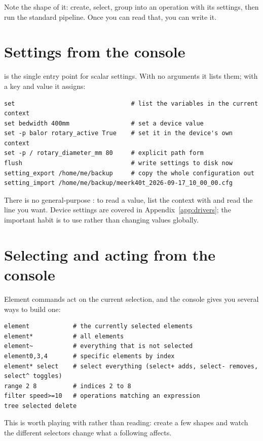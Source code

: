 \noindent Note the shape of it: create, select, group into an operation with its
settings, then run the standard pipeline. Once you can read that, you can write
it.

\section{Settings from the console}

 is the single entry point for scalar settings. With no arguments it
lists them; with a key and value it assigns:

\begin{lstlisting}[style=konsole]
set                                # list the variables in the current context
set bedwidth 400mm                 # set a device value
set -p balor rotary_active True    # set it in the device's own context
set -p / rotary_diameter_mm 80     # explicit path form
flush                              # write settings to disk now
setting_export /home/me/backup     # copy the whole configuration out
setting_import /home/me/backup/meerk40t_2026-09-17_10_00_00.cfg
\end{lstlisting}

\noindent There is no general-purpose : to read a value, list the
context with  and read the line you want. Device settings are covered in
Appendix~\ref{app:drivers}; the important habit is to use 
rather than changing values globally.

\section{Selecting and acting from the console}

Element commands act on the current selection, and the console gives you several
ways to build one:

\begin{lstlisting}[style=konsole]
element            # the currently selected elements
element*           # all elements
element~           # everything that is not selected
element0,3,4       # specific elements by index
element* select    # select everything (select+ adds, select- removes, select^ toggles)
range 2 8          # indices 2 to 8
filter speed>=10   # operations matching an expression
tree selected delete
\end{lstlisting}

\noindent This is worth playing with rather than reading: create a few shapes and
watch the different selectors change what a following 
affects.

